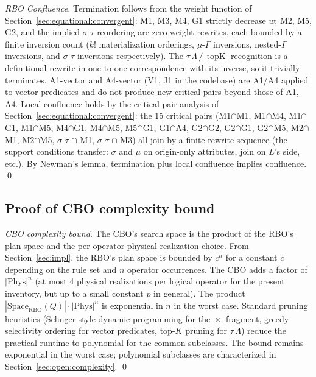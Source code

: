 \documentclass[acmsmall,review,anonymous]{acmart}
\theoremstyle{plain}
\theoremstyle{definition}
\newcommand{\topK}{\operatorname{topK}}
\theoremstyle{remark}
\begin{document}
\begin{proof}[RBO Confluence]
Termination follows from the weight function of
Section~\ref{sec:equational:convergent}: M1, M3, M4, G1
strictly decrease $w$; M2, M5, G2, and the implied
$\sigma$-$\tau$ reordering are zero-weight rewrites, each
bounded by a finite inversion count ($k!$ materialization
orderings, $\mu$-$\Gamma$ inversions, nested-$\Gamma$
inversions, and $\sigma$-$\tau$ inversions respectively).
The $\tau\,\Lambda\,/\,\topK$ recognition is a definitional
rewrite in one-to-one correspondence with its inverse, so it
trivially terminates. A1-vector and A4-vector (V1, J1 in
the codebase) are A1/A4 applied to vector predicates and
do not produce new critical pairs beyond those of A1, A4.
Local confluence holds by the critical-pair analysis of
Section~\ref{sec:equational:convergent}: the 15 critical
pairs (M1$\cap$M1, M1$\cap$M4, M1$\cap$G1,
M1$\cap$M5, M4$\cap$G1, M4$\cap$M5, M5$\cap$G1, G1$\cap$A4,
G2$\cap$G2, G2$\cap$G1, G2$\cap$M5, M2$\cap$M1, M2$\cap$M5,
$\sigma$-$\tau$ $\cap$ M1, $\sigma$-$\tau$ $\cap$ M3) all
join by a finite rewrite sequence (the support conditions
transfer: $\sigma$ and $\mu$ on origin-only attributes, join
on $L$'s side, etc.). By Newman's lemma, termination plus
local confluence implies confluence.
\qed
\end{proof}

\subsection{Proof of CBO complexity bound}\label{app:cbo-complexity}

\begin{proof}[CBO complexity bound]
The CBO's search space is the product of the RBO's plan space and
the per-operator physical-realization choice. From
Section~\ref{sec:impl}, the RBO's plan space is bounded by
$c^n$ for a constant $c$ depending on the rule set and $n$ operator
occurrences. The CBO adds a factor of $|\mathrm{Phys}|^n$ (at most 4
physical realizations per logical operator for the present
inventory, but up to a small constant $p$ in general). The product
$|\mathrm{Space}_{\mathrm{RBO}}(Q)| \cdot |\mathrm{Phys}|^n$ is
exponential in $n$ in the worst case. Standard pruning heuristics
(Selinger-style dynamic programming for the $\bowtie$-fragment,
greedy selectivity ordering for vector predicates, top-$K$ pruning
for $\tau\, \Lambda$) reduce the practical runtime to polynomial
for the common subclasses. The bound remains exponential in the
worst case; polynomial subclasses are characterized in
Section~\ref{sec:open:complexity}. \qed
\end{proof}
\end{document}
